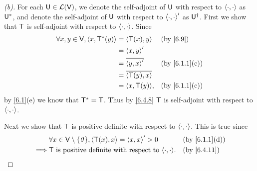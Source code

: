 \begin{proof}[(b)]
  For each \(\mathsf{U} \in \mathcal{L}(\mathsf{V})\), we denote the self-adjoint of \(\mathsf{U}\) with respect to \(\left\langle\cdot, \cdot\right\rangle\) as \(\mathsf{U}^*\), and denote the self-adjoint of \(\mathsf{U}\) with respect to \(\left\langle\cdot, \cdot\right\rangle'\) as \(\mathsf{U}^{\dag}\).
  First we show that \(\mathsf{T}\) is self-adjoint with respect to \(\left\langle\cdot, \cdot\right\rangle\).
  Since
  \begin{align*}
    \forall x, y \in \V, \inn{x, \T^*(y)} & = \inn{\T(x), y}        &  & \text{(by \cref{6.9})}      \\
                                          & = \inn{x, y}'                                            \\
                                          & = \conj{\inn{y, x}'}    &  & \text{(by \cref{6.1.1}(c))} \\
                                          & = \conj{\inn{\T(y), x}}                                  \\
                                          & = \inn{x, \T(y)},       &  & \text{(by \cref{6.1.1}(c))}
  \end{align*}
  by \cref{6.1}(e) we know that \(\mathsf{T}^* = \mathsf{T}\).
  Thus by \cref{6.4.8} \(\mathsf{T}\) is self-adjoint with respect to \(\left\langle\cdot, \cdot\right\rangle\).

  Next we show that \(\mathsf{T}\) is positive definite with respect to \(\left\langle\cdot, \cdot\right\rangle\).
  This is true since
  \begin{align*}
             & \forall x \in \V \setminus \set{\zv}, \inn{\T(x), x} = \inn{x, x}' > 0 &  & \text{(by \cref{6.1.1}(d))} \\
    \implies & \T \text{ is positive definite with respect to } \inn{\cdot, \cdot}.   &  & \text{(by \cref{6.4.11})}
  \end{align*}


\end{proof}
